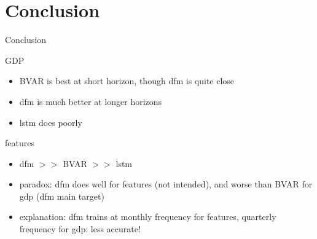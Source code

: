 \section{Conclusion}

\begin{frame}{Conclusion}

\begin{block}{GDP}
	\begin{itemize}
	\item BVAR is best at short horizon, though dfm is quite close
	\item dfm is much better at longer horizons
	\item lstm does poorly
\end{itemize}
\end{block}


\begin{exampleblock}{features}
		\begin{itemize}
	\item dfm $>>$ BVAR $>>$ lstm
	\item paradox: dfm does well for features (not intended), and worse than BVAR for gdp (dfm main target)
	\item explanation: dfm trains at monthly frequency for features, quarterly frequency for gdp: less accurate! 
\end{itemize}
\end{exampleblock}
	
\end{frame}